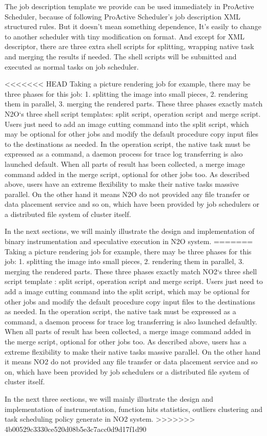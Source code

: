The job description template we provide can be used immediately in ProActive Scheduler, because of following ProActive Scheduler’s job description XML structured rules. But it doesn't mean something dependence, It’s easily to change to another scheduler with tiny modification on format. And except for XML descriptor, there are three extra shell scripts for splitting, wrapping native task and merging the results if needed. The shell scripts will be submitted and executed as normal tasks on job scheduler.

<<<<<<< HEAD
Taking a picture rendering job for example, there may be three phases for this job: 1. splitting the image into small pieces, 2. rendering them in parallel, 3. merging the rendered parts. These three phases exactly match N2O‘s three shell script templates: split script, operation script and merge script. Users just need to add an image cutting command into the split script, which may be optional for other jobs and modify the default procedure copy input files to the destinations as needed. In the operation script, the native task must be  expressed as a command, a daemon process for trace log transferring is also launched default. When all parts of result has been collected, a merge image command added in the merge script, optional for other jobs too. As described above,  users have an extreme flexibility to make their native tasks massive parallel. On the other hand it means N2O do not provided any file transfer or data placement service and so on, which have been provided by job schedulers or a distributed file system of cluster itself.

In the next sections, we will mainly illustrate the design and implementation of binary instrumentation and speculative execution in N2O system. 
=======
Taking a picture rendering job for example, there may be three phases for this job: 1. splitting the image into small pieces, 2. rendering them in parallel, 3. merging the rendered parts. These three phases exactly match NO2‘s three shell script template : split script, operation script and merge script. Users just need to add a image cutting command into the split script, which may be optional for other jobs and modify the default procedure copy input files to the destinations as needed. In the operation script, the native task must be  expressed as a command, a daemon process for trace log transferring is also launched defaultly. When all parts of result has been collected, a merge image command added in the merge script, optional for other jobs too. As described above,  users has a extreme flexibility to make their native tasks massive parallel. On the other hand it means NO2 do not provided any file transfer or data placement service and so on, which have been provided by job schedulers or a distributed file system of cluster itself.

In the next three sections, we will mainly illustrate the design and implementation of instrumentation, function hits statistics, outliers clustering and task scheduling policy generate in NO2 system.
>>>>>>> 4b00529c3330ce520d08b5e3c7acc0d9d17f1d90
